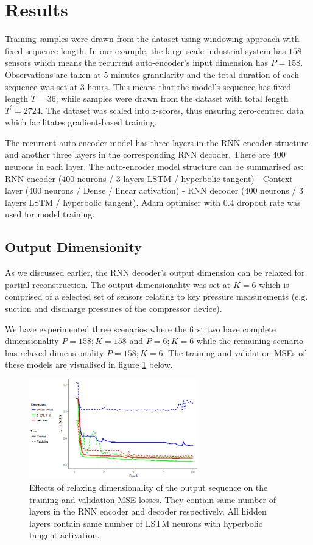 \documentclass[runningheads]{llncs}
\begin{document}
\section{Results}

Training samples were drawn from the dataset using windowing approach with fixed sequence length. In our example, the large-scale industrial system has \(158\) sensors which means the recurrent auto-encoder's input dimension has \(P=158\). Observations are taken at \(5\) minutes granularity and the total duration of each sequence was set at \(3\) hours. This means that the model's sequence has fixed length \(T=36\), while samples were drawn from the dataset with total length \(T^\prime=2724\). The dataset was scaled into \(z\)-scores, thus ensuring zero-centred data which facilitates gradient-based training.

The recurrent auto-encoder model has three layers in the RNN encoder structure and another three layers in the corresponding RNN decoder. There are \(400\) neurons in each layer. The auto-encoder model structure can be summarised as: RNN encoder (\(400\) neurons / \(3\) layers LSTM / hyperbolic tangent) - Context layer (\(400\) neurons / Dense / linear activation) - RNN decoder (\(400\) neurons / \(3\) layers LSTM / hyperbolic tangent). Adam optimiser \cite{kingma} with \(0.4\) dropout rate was used for model training.

\subsection{Output Dimensionity}

As we discussed earlier, the RNN decoder's output dimension can be relaxed for partial reconstruction. The output dimensionality was set at \(K=6\) which is comprised of a selected set of sensors relating to key pressure measurements (e.g. suction and discharge pressures of the compressor device).

We have experimented three scenarios where the first two have complete dimensionality \(P=158; K=158\) and \(P=6; K=6\) while the remaining scenario has relaxed dimensionality \(P=158; K=6\). The training and validation MSEs of these models are visualised in figure \ref{fig:output_dims} below.

\begin{figure}[h]
	\centering
	\includegraphics[width=0.65\textwidth]{output_dims.png}
	\caption{Effects of relaxing dimensionality of the output sequence on the training and validation MSE losses. They contain same number of layers in the RNN encoder and decoder respectively. All hidden layers contain same number of LSTM neurons with hyperbolic tangent activation.}
	\label{fig:output_dims}
\end{figure}
\end{document}
